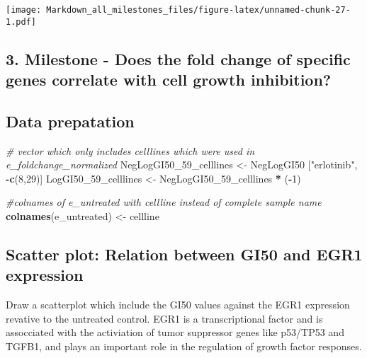 \documentclass[]{article}
\newenvironment{Shaded}{\begin{snugshade}}{\end{snugshade}}
\newcommand{\CommentTok}[1]{\textcolor[rgb]{0.56,0.35,0.01}{\textit{#1}}}
\newcommand{\DecValTok}[1]{\textcolor[rgb]{0.00,0.00,0.81}{#1}}
\newcommand{\KeywordTok}[1]{\textcolor[rgb]{0.13,0.29,0.53}{\textbf{#1}}}
\newcommand{\NormalTok}[1]{#1}
\newcommand{\OperatorTok}[1]{\textcolor[rgb]{0.81,0.36,0.00}{\textbf{#1}}}
\newcommand{\StringTok}[1]{\textcolor[rgb]{0.31,0.60,0.02}{#1}}
\begin{document}
\texttt{[image: Markdown\_all\_milestones\_files/figure-latex/unnamed-chunk-27-1.pdf]}

\hypertarget{milestone---does-the-fold-change-of-specific-genes-correlate-with-cell-growth-inhibition}{%
\subsection{3. Milestone - Does the fold change of specific genes
correlate with cell growth
inhibition?}\label{milestone---does-the-fold-change-of-specific-genes-correlate-with-cell-growth-inhibition}}

\hypertarget{data-prepatation}{%
\subsection{Data prepatation}\label{data-prepatation}}

\begin{Shaded}
\begin{Highlighting}[]
\CommentTok{# vector which only includes celllines which were used in e_foldchange_normalized}
\NormalTok{NegLogGI50_}\DecValTok{59}\NormalTok{_celllines <-}\StringTok{ }\NormalTok{NegLogGI50 [}\StringTok{"erlotinib"}\NormalTok{, }\OperatorTok{-}\KeywordTok{c}\NormalTok{(}\DecValTok{8}\NormalTok{,}\DecValTok{29}\NormalTok{)]}
\NormalTok{LogGI50_}\DecValTok{59}\NormalTok{_celllines <-}\StringTok{ }\NormalTok{NegLogGI50_}\DecValTok{59}\NormalTok{_celllines }\OperatorTok{*}\StringTok{ }\NormalTok{(}\OperatorTok{-}\DecValTok{1}\NormalTok{)}


\CommentTok{#colnames of e_untreated with cellline instead of complete sample name}
\KeywordTok{colnames}\NormalTok{(e_untreated) <-}\StringTok{ }\NormalTok{cellline}
\end{Highlighting}
\end{Shaded}

\hypertarget{scatter-plot-relation-between-gi50-and-egr1-expression}{%
\subsection{Scatter plot: Relation between GI50 and EGR1
expression}\label{scatter-plot-relation-between-gi50-and-egr1-expression}}

Draw a scatterplot which include the GI50 values against the EGR1
expression revative to the untreated control. EGR1 is a transcriptional
factor and is assocciated with the activiation of tumor suppressor genes
like p53/TP53 and TGFB1, and plays an important role in the regulation
of growth factor responses.
\end{document}
